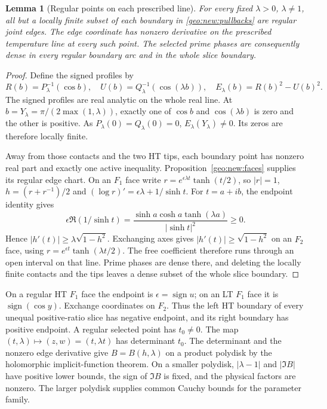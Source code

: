 \documentclass[11pt]{article}
\numberwithin{equation}{section}
\newtheorem{lemma}[theorem]{Lemma}
\theoremstyle{definition}
\begin{document}
\begin{lemma}[Regular points on each prescribed line]
\label{geo:new:slices}
For every fixed $\lambda>0$, $\lambda\ne1$, all but a locally
finite subset of each boundary in \eqref{geo:new:pullbacks}
are regular joint edges.  The edge coordinate has nonzero
derivative on the prescribed temperature line at every such point.
The selected prime phases are consequently dense in every
regular boundary arc and in the whole slice boundary.
\end{lemma}
\begin{proof}
Define the signed profiles by
\[
 R(b)=P_\lambda^{-1}(\cos b),\quad
 U(b)=Q_\lambda^{-1}(\cos(\lambda b)),\quad
 E_\lambda(b)=R(b)^2-U(b)^2.
\]
The signed profiles are real analytic on the whole real line.
At $b=Y_\lambda=\pi/(2\max(1,\lambda))$, exactly one of
$\cos b$ and $\cos(\lambda b)$ is zero and the other is positive.
As $P_\lambda(0)=Q_\lambda(0)=0$, $E_\lambda(Y_\lambda)\ne0$.
Its zeros are therefore locally finite.

Away from those contacts and the two HT tips, each boundary point
has nonzero real part and exactly one active inequality.
Proposition~\ref{geo:new:faces} supplies its regular edge chart.
On an $F_1$ face write
$r=e^{\epsilon\lambda t}\tanh(t/2)$, so $|r|=1$,
$h=(r+r^{-1})/2$ and $(\log r)'=\epsilon\lambda+1/\sinh t$.
For $t=a+ib$, the endpoint identity gives
\[
 \epsilon\Re(1/\sinh t)
  =\frac{\sinh a\cosh a\tanh(\lambda a)}{|\sinh t|^2}\ge0.
\]
Hence $|h'(t)|\ge\lambda\sqrt{1-h^2}$. Exchanging axes gives
$|h'(t)|\ge\sqrt{1-h^2}$ on an $F_2$ face, using
$r=e^{\epsilon t}\tanh(\lambda t/2)$. The free coefficient
therefore runs through an open interval on that line. Prime
phases are dense there, and deleting the locally finite contacts
and the tips leaves a dense subset of the whole slice boundary.
\end{proof}

On a regular HT $F_1$ face the endpoint is
$\epsilon=\operatorname{sign}u$; on an LT $F_1$ face it is
$\operatorname{sign}(\cos y)$.  Exchange coordinates on $F_2$.
Thus the left HT boundary of every unequal positive-ratio slice
has negative endpoint, and its right boundary has positive
endpoint.  A regular selected point has $t_0\ne0$.  The map
$(t,\lambda)\mapsto(z,w)=(t,\lambda t)$ has determinant $t_0$.
The determinant and the nonzero edge derivative give $B=B(h,\lambda)$
on a product polydisk by the holomorphic implicit-function theorem.
On a smaller polydisk, $|\lambda-1|$ and $|\Im B|$ have positive lower
bounds, the sign of $\Im B$ is fixed, and the physical factors are
nonzero. The larger polydisk supplies common Cauchy bounds for the
parameter family.
\end{document}
